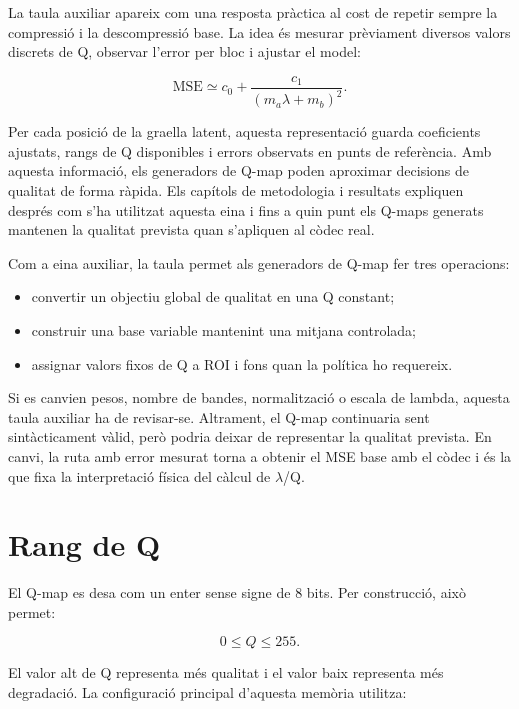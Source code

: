 La taula auxiliar apareix com una resposta pràctica al cost de repetir sempre la
compressió i la descompressió base. La idea és mesurar prèviament diversos valors
discrets de Q, observar l'error per bloc i ajustar el model:

\begin{equation}
\mathrm{MSE}\simeq c_0+\frac{c_1}{(m_a\lambda+m_b)^2}.
\end{equation}

Per cada posició de la graella latent, aquesta representació guarda coeficients
ajustats, rangs de Q disponibles i errors observats en punts de referència. Amb
aquesta informació, els generadors de Q-map poden aproximar decisions de qualitat
de forma ràpida. Els capítols de metodologia i resultats expliquen després com
s'ha utilitzat aquesta eina i fins a quin punt els Q-maps generats mantenen la
qualitat prevista quan s'apliquen al còdec real.

Com a eina auxiliar, la taula permet als generadors de Q-map fer tres operacions:

\begin{itemize}[leftmargin=*]
  \item convertir un objectiu global de qualitat en una Q constant;
  \item construir una base variable mantenint una mitjana controlada;
  \item assignar valors fixos de Q a ROI i fons quan la política ho requereix.
\end{itemize}

Si es canvien pesos, nombre de bandes, normalització o escala de lambda, aquesta
taula auxiliar ha de revisar-se. Altrament, el Q-map continuaria sent
sintàcticament vàlid, però podria deixar de representar la qualitat prevista. En
canvi, la ruta amb error mesurat torna a obtenir el MSE base amb el còdec i és la
que fixa la interpretació física del càlcul de $\lambda$/Q.

\section{Rang de Q}\label{sec:qrange}

El Q-map es desa com un enter sense signe de 8 bits. Per construcció, això
permet:

\begin{equation}
0\leq Q\leq255.
\end{equation}

El valor alt de Q representa més qualitat i el valor baix representa més
degradació. La configuració principal d'aquesta memòria utilitza:

